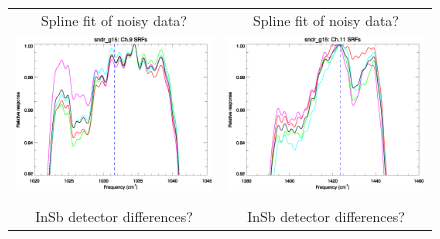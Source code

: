 \begin{figure}[htp]
  \centering
  \begin{tabular}{c c}
    \hspace{1.0em}\textsf{Spline fit of noisy data?} &
    \textsf{Spline fit of noisy data?} \\
    \includegraphics[scale=0.5]{graphics/zoom_anomaly/sndr_g15.ch9.srf.eps} &
    \includegraphics[scale=0.5]{graphics/zoom_anomaly/sndr_g15.ch11.srf.eps} \\\\
    \hspace{1.0em}\textsf{InSb detector differences?} &
    \hspace{1.0em}\textsf{InSb detector differences?} \\

\end{tabular}
\end{figure}
